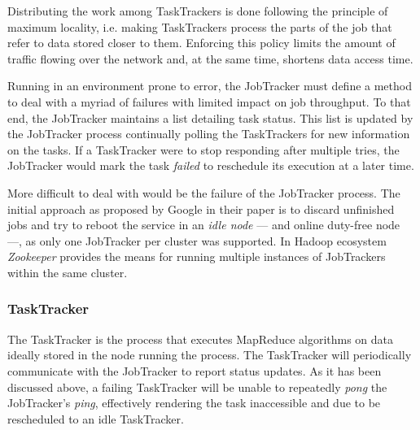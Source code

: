 Distributing the work among TaskTrackers is done following the principle of maximum locality, i.e. making TaskTrackers process the parts of the job that refer to data stored closer to them. Enforcing this policy limits the amount of traffic flowing over the network and, at the same time, shortens data access time.

Running in an environment prone to error, the JobTracker must define a method to deal with a myriad of failures with limited impact on job throughput. To that end, the JobTracker maintains a list detailing task status. This list is updated by the JobTracker process continually polling the TaskTrackers for new information on the tasks. If a TaskTracker were to stop responding after multiple tries, the JobTracker would mark the task \emph{failed} to reschedule its execution at a later time.

More difficult to deal with would be the failure of the JobTracker process. The initial approach as proposed by Google in their paper \cite{googlemapreduce} is to discard unfinished jobs and try to reboot the service in an \emph{idle node} --- and online duty-free node ---, as only one JobTracker per cluster was supported. In Hadoop ecosystem \emph{Zookeeper} provides the means for running multiple instances of JobTrackers within the same cluster.

\subsubsection{TaskTracker}\label{subsubsec:tasktracker}
\noindent The TaskTracker is the process that executes MapReduce algorithms on data ideally stored in the node running the process. The TaskTracker will periodically communicate with the JobTracker to report status updates. As it has been discussed above, a failing TaskTracker will be unable to repeatedly \emph{pong} the JobTracker's \emph{ping}, effectively rendering the task inaccessible and due to be rescheduled to an idle TaskTracker.
